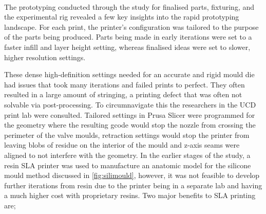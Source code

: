 \\
The prototyping conducted through the study for finalised parts, fixturing, and the experimental rig revealed a few key insights into the rapid prototyping landscape. For each print, the printer's configuration was tailored to the purpose of the parts being produced. Parts being made in early iterations were set to a faster infill and layer height setting, whereas finalised ideas were set to slower, higher resolution settings.

These dense high-definition settings needed for an accurate and rigid mould die had issues that took many iterations and failed prints to perfect. They often resulted in a large amount of stringing, a printing defect that was often not solvable via post-processing. To circumnavigate this the researchers in the UCD print lab were consulted. Tailored settings in Prusa Slicer were programmed for the geometry where the resulting gcode would stop the nozzle from crossing the perimeter of the valve moulds, retraction settings would stop the printer from leaving blobs of residue on the interior of the mould and z-axis seams were aligned to not interfere with the geometry.
\mynewline
In the earlier stages of the study, a resin \gls{SLA} printer was used to manufacture an anatomic model for the silicone mould method discussed in \cref{fig:silimould}, however, it was not feasible to develop further iterations from resin due to the printer being in a separate lab and having a much higher cost with proprietary resins. Two major benefits to \gls{SLA} printing are;

